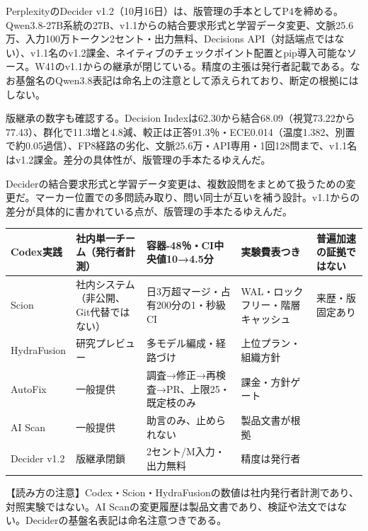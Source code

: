 \documentclass[lualatex,a4paper,10pt]{jlreq}
\begin{document}
PerplexityのDecider v1.2（10月16日）は、版管理の手本としてP4を締める。Qwen3.8-27B系統の27B、v1.1からの結合要求形式と学習データ変更、文脈25.6万、入力100万トークン2セント・出力無料、Decisions API（対話端点ではない）、v1.1名のv1.2課金、ネイティブのチェックポイント配置とpip導入可能なソース。W41のv1.1からの継承が閉じている。精度の主張は発行者記載である。なお基盤名のQwen3.8表記は命名上の注意として添えられており、断定の根拠にはしない。
\cite{B37,B36,B38}


版継承の数字も確認する。Decision Indexは62.30から結合68.09（視覚73.22から77.43）、群化で11.3増と4.8減、較正は正答91.3％・ECE0.014（温度1.382、別置で約0.05過信）、FP8経路の劣化、文脈25.6万・API専用・1回128問まで、v1.1名はv1.2課金。差分の具体性が、版管理の手本たるゆえんだ。
\cite{B37,B36,B38}


Deciderの結合要求形式と学習データ変更は、複数設問をまとめて扱うための変更だ。マーカー位置での多問読み取り、問い同士が互いを補う設計。v1.1からの差分が具体的に書かれている点が、版管理の手本たるゆえんだ。
\cite{B37,B36,B38}


\begin{strip} %
\centering\footnotesize
{}
\begin{tabularx}{0.96\linewidth}{@{}lXXXX@{}}
\toprule
Codex実践 & 社内単一チーム（発行者計測） & 容器-48％・CI中央値10→4.5分 & 実験費表つき & 普遍加速の証拠ではない \cite{B31} \\
\midrule
Scion & 社内システム（非公開、Git代替ではない） & 日3万超マージ・占有200分の1・秒級CI & WAL・ロックフリー・階層キャッシュ & 来歴・版固定あり \cite{B32,B75} \\
\midrule
HydraFusion & 研究プレビュー & 多モデル編成・経路づけ & 上位プラン・組織方針 \cite{B33,B76} \\
\midrule
AutoFix & 一般提供 & 調査→修正→再検査→PR、上限25・既定枝のみ & 課金・方針ゲート \cite{B34,B77} \\
\midrule
AI Scan & 一般提供 & 助言のみ、止められない & 製品文書が根拠 \cite{B35,B78} \\
\midrule
Decider v1.2 & 版継承閉鎖 & 2セント/M入力・出力無料 & 精度は発行者 \cite{B37,B36,B38} \\
\bottomrule
\end{tabularx}
\end{strip} %

\begin{tcolorbox}[colback=SurveySoft,colframe=SurveyRule,arc=1mm,boxrule=0.4pt,left=2mm,right=2mm]
【読み方の注意】Codex・Scion・HydraFusionの数値は社内発行者計測であり、対照実験ではない。AI Scanの変更履歴は製品文書であり、検証や法文ではない。Deciderの基盤名表記は命名注意つきである。
\end{tcolorbox}
\cite{B31,B32,B75,B33,B76,B34,B77,B35,B78,B37,B36,B38}
\end{document}
